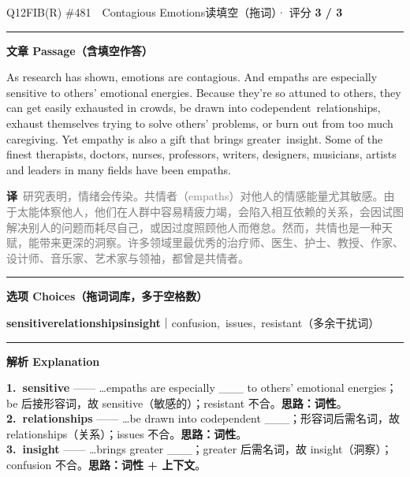 \documentclass[11pt]{article}
\newcommand{\ptesub}[1]{%
  \par\needspace{2\baselineskip}\smallskip
  {\color{cAccent}\rule[-0.2ex]{3pt}{1.05em}}\hspace{6pt}%
  {\bfseries\color{cHead}#1}\par\nopagebreak\smallskip}
\newcommand{\zh}[1]{{\footnotesize\textcolor{cNote}{\textbf{译}}\ \textcolor{gray}{#1}}}
\newcommand{\rok}[1]{{\color{cFix}\ding{51}\,#1}}                 %
\begin{document}
\begin{qblock}{Q12\quad FIB(R) \#481\ \ Contagious Emotions}{读填空（拖词）· 评分 \textcolor{cAccent}{\bfseries 3 / 3}}
\ptesub{文章 Passage（含填空作答）}
\begin{promptbox}
As research has shown, emotions are contagious. And empaths are especially \rok{sensitive} to others' emotional energies. Because they're so attuned to others, they can get easily exhausted in crowds, be drawn into codependent \rok{relationships}, exhaust themselves trying to solve others' problems, or burn out from too much caregiving. Yet empathy is also a gift that brings greater \rok{insight}. Some of the finest therapists, doctors, nurses, professors, writers, designers, musicians, artists and leaders in many fields have been empaths.
\end{promptbox}
\zh{研究表明，情绪会传染。共情者（empaths）对他人的情感能量尤其敏感。由于太能体察他人，他们在人群中容易精疲力竭，会陷入相互依赖的关系，会因试图解决别人的问题而耗尽自己，或因过度照顾他人而倦怠。然而，共情也是一种天赋，能带来更深的洞察。许多领域里最优秀的治疗师、医生、护士、教授、作家、设计师、音乐家、艺术家与领袖，都曾是共情者。}
\ptesub{选项 Choices（拖词词库，多于空格数）}
{\small \textbf{sensitive}\quad \textbf{relationships}\quad \textbf{insight}\quad ｜\quad confusion,\ issues,\ resistant（多余干扰词）}
\ptesub{解析 Explanation}
\begin{notebox}\footnotesize
\textbf{1.\ sensitive} —— …empaths are especially \_\_\_ to others' emotional energies；be 后接形容词，故 sensitive（敏感的）；resistant 不合。\textbf{思路：词性}。\\[2pt]
\textbf{2.\ relationships} —— …be drawn into codependent \_\_\_；形容词后需名词，故 relationships（关系）；issues 不合。\textbf{思路：词性}。\\[2pt]
\textbf{3.\ insight} —— …brings greater \_\_\_；greater 后需名词，故 insight（洞察）；confusion 不合。\textbf{思路：词性 + 上下文}。
\end{notebox}
\end{qblock}
\end{document}
